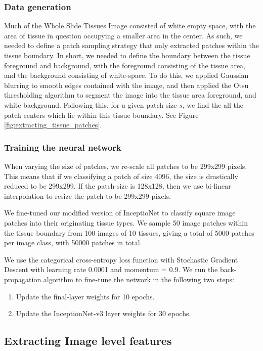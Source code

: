 \documentclass[graybox]{svmult}
\begin{document}
\subsubsection{Data generation}

Much of the Whole Slide Tissues Image consisted of white empty space, with the area of tissue in question occupying a smaller area in the center. As such, we needed to define a patch sampling strategy that only extracted patches within the tissue boundary. In short, we needed to define the boundary between the tissue foreground and background, with the foreground consisting of the tissue area, and the background consisting of white-space. To do this, we applied Gaussian blurring to smooth edges contained with the image, and then applied the Otsu thresholding algorithm to segment the image into the tissue area foreground, and white background. Following this, for a given patch size $s$, we find the all the patch centers which lie within this tissue boundary. See Figure \ref{fig:extracting_tissue_patches}.

\subsubsection{Training the neural network}

When varying the size of patches, we re-scale all patches to be 299x299 pixels. This means that if we classifying a patch of size 4096, the size is drastically reduced to be 299x299. If the patch-size is 128x128, then we use bi-linear interpolation to resize the patch to be 299x299 pixels.

We fine-tuned our modified version of InceptioNet to classify square image patches into their originating tissue types. We sample 50 image patches within the tissue boundary from 100 images of 10 tissues, giving a total of 5000 patches per image class, with 50000 patches in total.

We use the categorical cross-entropy loss function with Stochastic Gradient Descent with learning rate 0.0001 and momentum = 0.9. We run the back-propagation algorithm to fine-tune the network in the following two steps:
\begin{enumerate}
 \item Update the final-layer weights for 10 epochs.
 \item Update the InceptionNet-v3 layer weights for 30 epochs.
\end{enumerate}


\subsection{Extracting Image level features}
\end{document}
